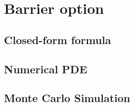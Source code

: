 \section{Barrier option}

\subsection{Closed-form formula}
\newpage
\subsection{Numerical PDE}
\newpage
\subsection{Monte Carlo Simulation}
\newpage

